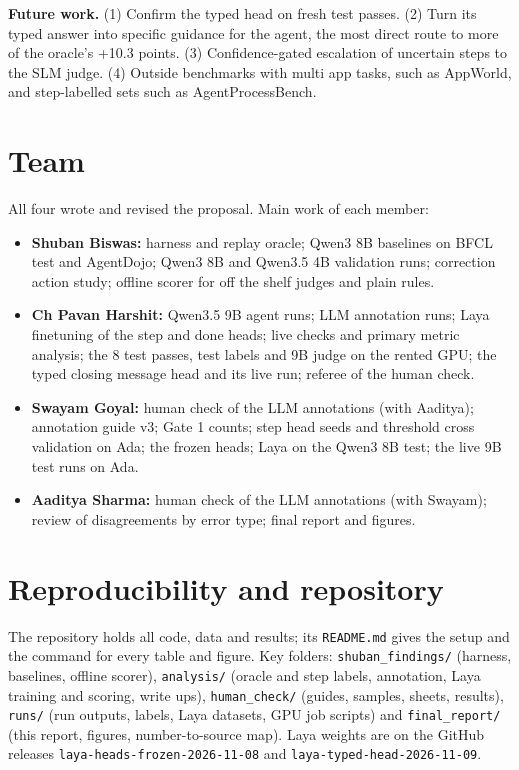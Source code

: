 \documentclass[10pt,a4paper]{article}
\newcommand{\code}[1]{\texttt{#1}}
\begin{document}
\textbf{Future work.} (1) Confirm the typed head on fresh test passes. (2) Turn its typed answer into specific guidance for the agent, the most direct route to more of the oracle's +10.3 points. (3) Confidence-gated escalation of uncertain steps to the SLM judge. (4) Outside benchmarks with multi app tasks, such as AppWorld, and step-labelled sets such as AgentProcessBench.

\section{Team}
All four wrote and revised the proposal. Main work of each member:
\begin{itemize}
  \item \textbf{Shuban Biswas:} harness and replay oracle; Qwen3 8B baselines on BFCL test and AgentDojo; Qwen3 8B and Qwen3.5 4B validation runs; correction action study; offline scorer for off the shelf judges and plain rules.
  \item \textbf{Ch Pavan Harshit:} Qwen3.5 9B agent runs; LLM annotation runs; Laya finetuning of the step and done heads; live checks and primary metric analysis; the 8 test passes, test labels and 9B judge on the rented GPU; the typed closing message head and its live run; referee of the human check.
  \item \textbf{Swayam Goyal:} human check of the LLM annotations (with Aaditya); annotation guide v3; Gate 1 counts; step head seeds and threshold cross validation on Ada; the frozen heads; Laya on the Qwen3 8B test; the live 9B test runs on Ada.
  \item \textbf{Aaditya Sharma:} human check of the LLM annotations (with Swayam); review of disagreements by error type; final report and figures.
\end{itemize}

\section{Reproducibility and repository}\label{sec:repo}
The repository holds all code, data and results; its \code{README.md} gives the setup and the command for every table and figure. Key folders: \code{shuban\_findings/} (harness, baselines, offline scorer), \code{analysis/} (oracle and step labels, annotation, Laya training and scoring, write ups), \code{human\_check/} (guides, samples, sheets, results), \code{runs/} (run outputs, labels, Laya datasets, GPU job scripts) and \code{final\_report/} (this report, figures, number-to-source map). Laya weights are on the GitHub releases \code{laya-heads-frozen-2026-11-08} and \code{laya-typed-head-2026-11-09}.
\end{document}
